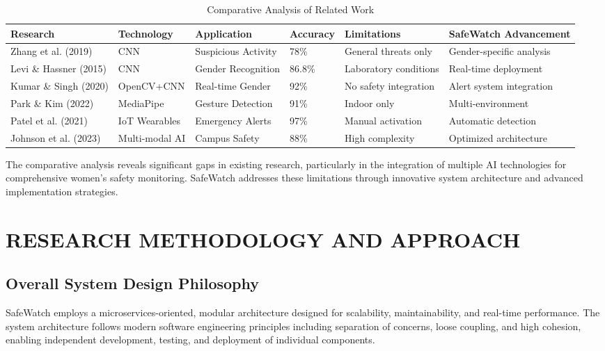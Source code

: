 \documentclass[12pt,a4paper]{article}
\begin{document}
\begin{table}[h]
\centering
\scriptsize
\begin{tabular}{|p{2cm}|p{2cm}|p{2.5cm}|p{2cm}|p{2cm}|p{2.5cm}|}
\hline
\textbf{Research} & \textbf{Technology} & \textbf{Application} & \textbf{Accuracy} & \textbf{Limitations} & \textbf{SafeWatch Advancement} \\
\hline
Zhang et al. (2019) & CNN & Suspicious Activity & 78\% & General threats only & Gender-specific analysis \\
\hline
Levi \& Hassner (2015) & CNN & Gender Recognition & 86.8\% & Laboratory conditions & Real-time deployment \\
\hline
Kumar \& Singh (2020) & OpenCV+CNN & Real-time Gender & 92\% & No safety integration & Alert system integration \\
\hline
Park \& Kim (2022) & MediaPipe & Gesture Detection & 91\% & Indoor only & Multi-environment \\
\hline
Patel et al. (2021) & IoT Wearables & Emergency Alerts & 97\% & Manual activation & Automatic detection \\
\hline
Johnson et al. (2023) & Multi-modal AI & Campus Safety & 88\% & High complexity & Optimized architecture \\
\hline
\end{tabular}
\caption{Comparative Analysis of Related Work}
\label{tab:literature-comparison}
\end{table}

The comparative analysis reveals significant gaps in existing research, particularly in the integration of multiple AI technologies for comprehensive women's safety monitoring. SafeWatch addresses these limitations through innovative system architecture and advanced implementation strategies.

\newpage
\section{RESEARCH METHODOLOGY AND APPROACH}

\subsection{Overall System Design Philosophy}

SafeWatch employs a microservices-oriented, modular architecture designed for scalability, maintainability, and real-time performance. The system architecture follows modern software engineering principles including separation of concerns, loose coupling, and high cohesion, enabling independent development, testing, and deployment of individual components.
\end{document}
